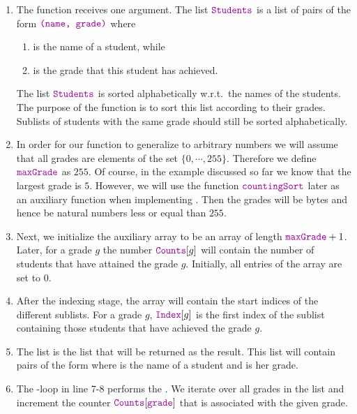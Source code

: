 \begin{enumerate}
\item The function  receives one argument.  The list $\mytt{Students}$
      is a list of pairs of the form $\mytt{(name, grade)}$ where
      \begin{enumerate}
      \item {}  is the name of a student, while
      \item {} is the grade that this student has achieved.
      \end{enumerate}
      The list $\mytt{Students}$ is sorted alphabetically w.r.t.~the names of the students.
      The purpose of the function  is to sort this list according to their grades.
      Sublists of students with the same grade should still be sorted alphabetically.
\item In order for our function to generalize to arbitrary numbers we will assume that all grades are elements
      of the set $\{0,\cdots,255\}$.  Therefore we define $\mytt{maxGrade}$ as $255$.
      Of course, in the example discussed so far we know that the largest
      grade is $5$.  However, we will use the function $\mytt{countingSort}$ later as an auxiliary function
      when implementing .  Then the grades will be bytes and hence be natural numbers less
      or equal than $255$.
\item Next, we initialize the auxiliary array  to be an array of length $\mytt{maxGrade}+1$.
      Later, for a grade $g$ the number $\mytt{Counts}[g]$ will contain the number of students that have
      attained the grade $g$.  Initially, all entries of the array  are set to $0$.
\item After the indexing stage, the array  will contain the start indices of the different sublists.
      For a grade $g$, $\mytt{Index}[g]$ is the first index of the sublist containing those students that
      have achieved the grade $g$.
\item The list  is the list that will be returned as the result.
      This list will contain pairs of the form  where  is the name of a student
      and  is her grade.
\item The -loop in line 7-8 performs the .  We iterate over all grades
      in the list  and increment the counter $\mytt{Counts}[\mytt{grade}]$ that is associated with the given grade.

\end{enumerate}
